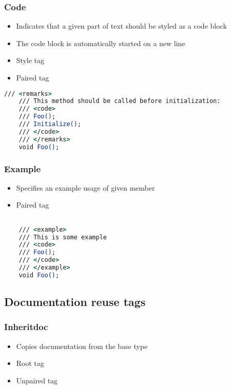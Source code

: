 \subsubsection*{Code}
\begin{itemize}
    \item Indicates that a given part of text should be styled as a code block
    \item The code block is automatically started on a new line
    \item Style tag
    \item Paired tag
\end{itemize}

\begin{lstlisting}[language=csh]
    /// <remarks>
    /// This method should be called before initialization:
    /// <code>
    /// Foo();
    /// Initialize();
    /// </code>
    /// </remarks>
    void Foo();
\end{lstlisting}

\subsubsection*{Example}
\begin{itemize}
    \item Specifies an example usage of given member
    \item Paired tag
\end{itemize}

\begin{lstlisting}[language=csh]

    /// <example>
    /// This is some example
    /// <code>
    /// Foo();
    /// </code>
    /// </example>
    void Foo();

\end{lstlisting}

\subsection{Documentation reuse tags}

\subsubsection*{Inheritdoc}
\begin{itemize}
    \item Copies documentation from the base type
    \item Root tag
    \item Unpaired tag
\end{itemize}

